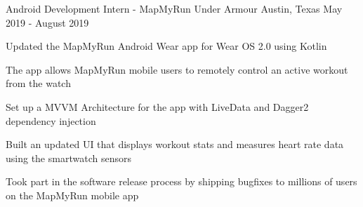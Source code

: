 


\begin{cventries}


\cventry
{Android Development Intern - MapMyRun} %
{Under Armour} %
{Austin, Texas} %
{May 2019 - August 2019} %
{%
\begin{cvitems}
\item {Updated the MapMyRun Android Wear app for Wear OS 2.0 using Kotlin}
\item {The app allows MapMyRun mobile users to remotely control an active workout from the watch}
\item {Set up a MVVM Architecture for the app with LiveData and Dagger2 dependency injection}
\item {Built an updated UI that displays workout stats and measures heart rate data using the smartwatch sensors}
\item {Took part in the software release process by shipping bugfixes to millions of users on the MapMyRun mobile app}
\end{cvitems}
}





\end{cventries}
